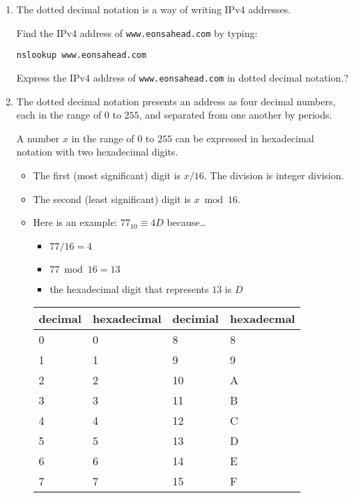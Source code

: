 \documentclass[twoside]{article}
\begin{document}
\begin{enumerate}
\begin{enumerate}
    \item The dotted decimal notation is a way of writing IPv4 addresses.
      
      Find the IPv4 address of \verb+www.eonsahead.com+ by typing:

      \verb+nslookup www.eonsahead.com+

      Express the IPv4 address of \verb+www.eonsahead.com+ in
      dotted decimal notation.?

    \item The dotted decimal notation presents an address as
      four decimal numbers, each in the range of $0$ to $255$,
      and separated from one another by periods.

      A number $x$ in the range of $0$ to $255$ can be expressed
      in hexadecimal notation with two hexadecimal digits.

    \begin{itemize}
      \item The first (most significant) digit is $x / 16$.
        The division is integer division.

      \item The second (least significant) digit is $x \bmod 16$.

      \item Here is an example: $77_{10} \equiv 4D$ because\ldots
      \begin{itemize}
        \item  $77 / 16 = 4$
        \item $77 \bmod 16 = 13$
        \item the hexadecimal digit that represents $13$ is $D$
        \end{itemize}

    \begin{tabular}{ll|ll}
      \textbf{decimal} & \textbf{hexadecimal} & \textbf{decimial} & \textbf{hexadecmal} \\ \hline
      0 & 0 & 8 & 8 \\
      1 & 1 & 9 & 9 \\
      2 & 2 & 10 & A \\
      3 & 3 & 11 & B \\
      4 & 4 & 12 & C \\
      5 & 5 & 13 & D \\
      6 & 6 & 14 & E \\
      7 & 7 & 15 & F
      \end{tabular}

      \end{itemize}


\end{enumerate}
\end{enumerate}
\end{document}

